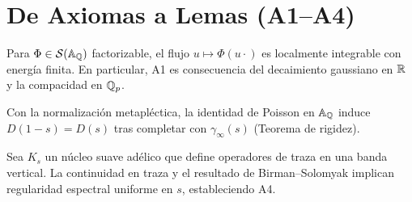 \section{De Axiomas a Lemas (A1--A4)}\label{sec:axiomas_a_lemas}

\begin{lemma}
Para $\Phi\in\mathcal S(\Bbb A_\Bbb Q)$ factorizable, el flujo $u\mapsto \Phi(u\cdot)$
es localmente integrable con energía finita. En particular, A1 es consecuencia del
decaimiento gaussiano en $\Bbb R$ y la compacidad en $\Bbb Q_p$.
\end{lemma}

\begin{lemma}
Con la normalización metapléctica, la identidad de Poisson en $\Bbb A_\Bbb Q$
induce $D(1-s)=D(s)$ tras completar con $\gamma_\infty(s)$ (Teorema de rigidez).
\end{lemma}

\begin{lemma}
Sea $K_s$ un núcleo suave adélico que define operadores de traza en una banda vertical.
La continuidad en traza y el resultado de Birman--Solomyak implican regularidad
espectral uniforme en $s$, estableciendo A4.
\end{lemma}
